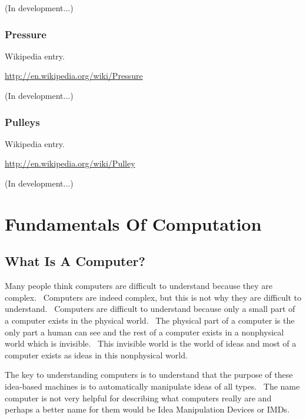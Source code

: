 \documentclass[12pt,twoside]{book}
\begin{document}
(In development...)

\subsection[Pressure]{Pressure}

Wikipedia entry.

\href{http://en.wikipedia.org/wiki/Pressure}{http://en.wikipedia.org/wiki/Pressure}

(In development...)

\subsection[Pulleys]{Pulleys}

Wikipedia entry.

\href{http://en.wikipedia.org/wiki/Pulley}{http://en.wikipedia.org/wiki/Pulley}

(In development...)


\bigskip


\bigskip

\chapter{Fundamentals Of Computation} \section[What Is A Computer?]{What Is A Computer?}

\bigskip

Many people think computers are difficult to understand because they are complex. \ Computers are indeed complex, but this is not why they are difficult to understand. \ Computers are difficult to understand because only a small part of a computer exists in the physical world. \ The physical part of a computer is the only part a human can see and the rest of a computer exists in a nonphysical world which is invisible. \ This invisible world is the world of ideas and most of a computer exists as ideas in this nonphysical world. 

\bigskip

The key to understanding computers is to understand that the purpose of these idea{}-based machines is to automatically manipulate ideas of all types. \ The name {\textquotesingle}computer{\textquotesingle} is not very helpful for describing what computers really are and perhaps a better name for them would be Idea Manipulation Devices or IMDs. 
\end{document}
